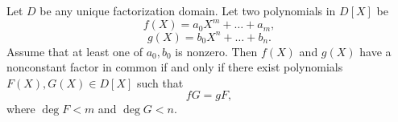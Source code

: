 Let $D$ be any unique factorization domain. Let two polynomials in $D[X]$ be
$$f(X) = a_0 X^m + \ldots + a_m,$$
$$g(X) = b_0 X^n + \ldots + b_n.$$
Assume that at least one of $a_0, b_0$ is nonzero. Then $f(X)$ and $g(X)$ have a nonconstant factor in common if and only if there exist polynomials $F(X), G(X) \in D[X]$ such that
$$fG = gF,$$
where $\deg F < m$ and $\deg G < n$.
